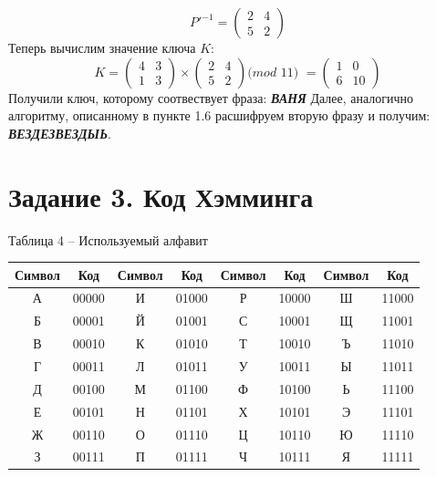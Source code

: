 \documentclass[a5paper, 10pt]{article}
\theoremstyle{definition}
\theoremstyle{plain}
\theoremstyle{remark}
\begin{document}
\begin{equation}
P'^{-1} =
\begin{pmatrix}
2 & 4\\
5 & 2
\end{pmatrix} 
\end{equation}
Теперь вычислим значение ключа $K$:
\begin{equation}
K =
\begin{pmatrix}
4 & 3\\
1 & 3
\end{pmatrix} 
\times
\begin{pmatrix}
2 & 4\\
5 & 2
\end{pmatrix} 
\textit{(mod 11) }=
\begin{pmatrix}
1 & 0\\
6 & 10
\end{pmatrix} 
\end{equation}
Получили ключ, которому соотвествует фраза: \textbf{\textit{ВАНЯ}}
Далее, аналогично алгоритму, описанному в пункте 1.6 расшифруем вторую фразу и получим:  \textbf{\textit{ВЕЗДЕЗВЕЗДЫЬ}}.


\section{Задание 3. Код Хэмминга}
\begin{center}
Таблица 4 -- Используемый алфавит\\
\begin{tabular}{ |c|c|c|c|c|c|c|c| } 
 \hline
Символ & Код & Символ & Код & Символ & Код & Символ & Код\\
\hline
А & 00000 & И  & 01000 & Р  & 10000  & Ш  & 11000 \\
 \hline
Б & 00001 & Й  & 01001 & С  & 10001  & Щ  & 11001 \\
 \hline
В & 00010 & К  & 01010 & Т  & 10010  & Ъ  & 11010 \\
 \hline
Г & 00011 & Л  & 01011 & У  & 10011  & Ы  & 11011 \\
 \hline
Д & 00100 & М  & 01100 & Ф  & 10100  & Ь  & 11100 \\
 \hline
Е & 00101 & Н & 01101 & Х  & 10101  & Э  & 11101 \\
 \hline
Ж & 00110 & О  & 01110 & Ц  & 10110  & Ю  & 11110 \\
 \hline
З & 00111 & П & 01111 & Ч  & 10111  & Я  & 11111 \\
 \hline
\end{tabular}
\end{center}
\end{document}

